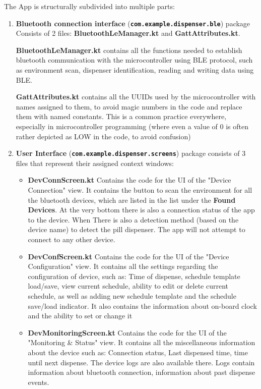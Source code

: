 The App is structurally subdivided into multiple parts: 
\begin{enumerate}
	\item \textbf{Bluetooth connection interface} (\texttt{\textbf{com.example.dispenser.ble}}) package Consists of 2 files: \textbf{BluetoothLeManager.kt} and \textbf{GattAttributes.kt}. 
	
	\textbf{BluetoothLeManager.kt} contains all the functions needed to establish bluetooth communication with the microcontroller using \ac{BLE} protocol, such as environment scan, dispenser identification, reading and writing data using \ac{BLE}.
	
	\textbf{GattAttributes.kt} contains all the \ac{UUID}s used by the microcontroller with names assigned to them, to avoid magic numbers in the code and replace them with named constants. This is a common practice everywhere, especially in microcontroller programming (where even a value of 0 is often rather depicted as LOW in the code, to avoid confusion)
	\item \textbf{User Interface} (\texttt{\textbf{com.example.dispenser.screens}}) package consists of 3 files that represent their assigned context windows:
	\begin{itemize}
		\item \textbf{DevConnScreen.kt} Contains the code for the UI of the "Device Connection" view. It contains the button to scan the environment for all the bluetooth devices, which are listed in the list under the \textbf{Found Devices}. At the very bottom there is also a connection status of the app to the device. When There is also a detection method (based on the device name) to detect the pill dispenser. The app will not attempt to connect to any other device.

		\item \textbf{DevConfScreen.kt} Contains the code for the UI of the "Device Configuration" view. It contains all the settings regarding the configuration of device, such as: Time of dispense, schedule template load/save, view current schedule, ability to edit or delete current schedule, as well as adding new schedule template and the schedule save/load indicator. It also contains the information about on-board clock and the ability to set or change it
		
		\item \textbf{DevMonitoringScreen.kt} Contains the code for the UI of the "Monitoring \& Status" view. It contains all the miscellaneous information about the device such as: Connection status, Last dispensed time, time until next dispense. The device logs are also available there. Logs contain information about bluetooth connection, information about past dispense events.
		

\end{itemize}
\end{enumerate}

